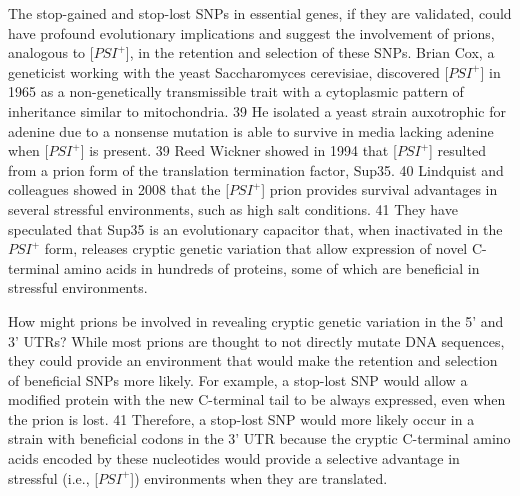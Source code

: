 The stop-gained and stop-lost SNPs in essential genes, if they are validated, could have profound evolutionary implications and suggest the involvement of prions, analogous to [$PSI^+$], in the retention and selection of these SNPs.  Brian Cox, a geneticist working with the yeast Saccharomyces cerevisiae, discovered [$PSI^+$] in 1965 as a non-genetically transmissible trait with a cytoplasmic pattern of inheritance similar to mitochondria. 39 He isolated a yeast strain auxotrophic for adenine due to a nonsense mutation is able to survive in media lacking adenine when [$PSI^+$] is present. 39 Reed Wickner showed in 1994 that [$PSI^+$] resulted from a prion form of the translation termination factor, Sup35. 40 Lindquist and colleagues showed in 2008 that the [$PSI^+$] prion provides survival advantages in several stressful environments, such as high salt conditions. 41 They have speculated that Sup35 is an evolutionary capacitor that, when inactivated in the $PSI^+$ form, releases cryptic genetic variation that allow expression of novel C-terminal amino acids in hundreds of proteins, some of which are beneficial in stressful environments. 

How might prions be involved in revealing cryptic genetic variation in the 5' and 3' UTRs? While most prions are thought to not directly mutate DNA sequences, they could provide an environment that would make the retention and selection of beneficial SNPs more likely. For example, a stop-lost SNP would allow a modified protein with the new C-terminal tail to be always expressed, even when the prion is lost. 41 Therefore, a stop-lost SNP would more likely occur in a strain with beneficial codons in the 3' UTR because the cryptic C-terminal amino acids encoded by these nucleotides would provide a selective advantage in stressful (i.e., [$PSI^+$]) environments when they are translated.

